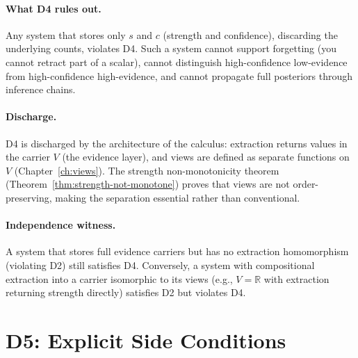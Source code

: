 \documentclass[11pt,openany]{report}
\begin{document}
\paragraph{What D4 rules out.}
Any system that stores only $s$ and $c$ (strength and confidence),
discarding the underlying counts, violates D4.  Such a system cannot
support forgetting (you cannot retract part of a scalar), cannot
distinguish high-confidence low-evidence from high-confidence
high-evidence, and cannot propagate full posteriors through inference
chains.

\paragraph{Discharge.}
D4 is discharged by the architecture of the calculus: extraction
returns values in the carrier $V$ (the evidence layer), and views
are defined as separate functions on $V$ (Chapter~\ref{ch:views}).
The strength non-monotonicity theorem
(Theorem~\ref{thm:strength-not-monotone}) proves that views are not
order-preserving, making the separation essential rather than
conventional.

\paragraph{Independence witness.}
A system that stores full evidence carriers but has no extraction
homomorphism (violating D2) still satisfies D4.  Conversely, a system
with compositional extraction into a carrier isomorphic to its views
(e.g., $V = \mathbb{R}$ with extraction returning strength directly)
satisfies D2 but violates D4.



\section{D5: Explicit Side Conditions}
\label{sec:d5}
\end{document}
